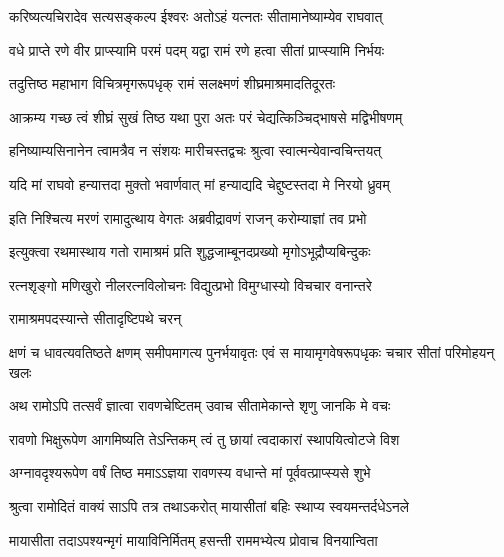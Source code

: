 \twolineshloka
{करिष्यत्यचिरादेव सत्यसङ्कल्प ईश्वरः}
{अतोऽहं यत्नतः सीतामानेष्याम्येव राघवात्} %

\twolineshloka
{वधे प्राप्ते रणे वीर प्राप्स्यामि परमं पदम्}
{यद्वा रामं रणे हत्वा सीतां प्राप्स्यामि निर्भयः} %

\twolineshloka
{तदुत्तिष्ठ महाभाग विचित्रमृगरूपधृक्}
{रामं सलक्ष्मणं शीघ्रमाश्रमादतिदूरतः} %

\twolineshloka
{आक्रम्य गच्छ त्वं शीघ्रं सुखं तिष्ठ यथा पुरा}
{अतः परं चेद्यत्किञ्चिद्भाषसे मद्विभीषणम्} %

\twolineshloka
{हनिष्याम्यसिनानेन त्वामत्रैव न संशयः}
{मारीचस्तद्वचः श्रुत्वा स्वात्मन्येवान्वचिन्तयत्} %

\twolineshloka
{यदि मां राघवो हन्यात्तदा मुक्तो भवार्णवात्}
{मां हन्याद्यदि चेद्दुष्टस्तदा मे निरयो ध्रुवम्} %

\twolineshloka
{इति निश्चित्य मरणं रामादुत्थाय वेगतः}
{अब्रवीद्रावणं राजन् करोम्याज्ञां तव प्रभो} %

\twolineshloka
{इत्युक्त्वा रथमास्थाय गतो रामाश्रमं प्रति}
{शुद्धजाम्बूनदप्रख्यो मृगोऽभूद्रौप्यबिन्दुकः} %

\twolineshloka
{रत्नशृङ्गो मणिखुरो नीलरत्नविलोचनः}
{विद्युत्प्रभो विमुग्धास्यो विचचार वनान्तरे} %

\onelineshloka
{रामाश्रमपदस्यान्ते सीतादृष्टिपथे चरन्} %


\fourlineindentedshloka
{क्षणं च धावत्यवतिष्ठते क्षणम्}
{समीपमागत्य पुनर्भयावृतः}
{एवं स मायामृगवेषरूपधृकः}
{चचार सीतां परिमोहयन् खलः} %






\twolineshloka
{अथ रामोऽपि तत्सर्वं ज्ञात्वा रावणचेष्टितम्}
{उवाच सीतामेकान्ते शृणु जानकि मे वचः} %

\twolineshloka
{रावणो भिक्षुरूपेण आगमिष्यति तेऽन्तिकम्}
{त्वं तु छायां त्वदाकारां स्थापयित्वोटजे विश} %

\twolineshloka
{अग्नावदृश्यरूपेण वर्षं तिष्ठ ममाऽऽज्ञया}
{रावणस्य वधान्ते मां पूर्ववत्प्राप्स्यसे शुभे} %

\twolineshloka
{श्रुत्वा रामोदितं वाक्यं साऽपि तत्र तथाऽकरोत्}
{मायासीतां बहिः स्थाप्य स्वयमन्तर्दधेऽनले} %

\twolineshloka
{मायासीता तदाऽपश्यन्मृगं मायाविनिर्मितम्}
{हसन्ती राममभ्येत्य प्रोवाच विनयान्विता} %


